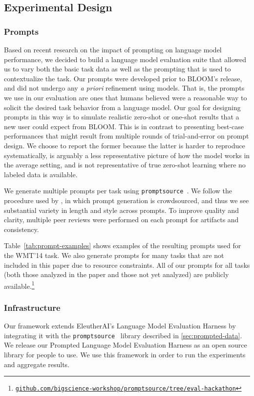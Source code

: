 \subsection{Experimental Design}
\label{sec:eval:design}

\subsubsection{Prompts} Based on recent research on the impact of prompting on language model performance, we decided to build a language model evaluation suite that allowed us to vary both the basic task data as well as the prompting that is used to contextualize the task. Our prompts were developed prior to BLOOM's release, and did not undergo any \textit{a priori} refinement using models. That is, the prompts we use in our evaluation are ones that humans believed were a reasonable way to solicit the desired task behavior from a language model. Our goal for designing prompts in this way is to simulate realistic zero-shot or one-shot results that a new user could expect from BLOOM. This is in contrast to presenting best-case performances that might result from multiple rounds of trial-and-error on prompt design. We choose to report the former because the latter is harder to reproduce systematically, is arguably a less representative picture of how the model works in the average setting, and is not representative of true zero-shot learning where no labeled data is available. 

We generate multiple prompts per task using \texttt{promptsource}~\citep{bach2022promptsource}. We follow the procedure used by \citet{sanh2022multitask}, in which prompt generation is crowdsourced, and thus we see substantial variety in length and style across prompts. To improve quality and clarity, multiple peer reviews were performed on each prompt for artifacts and consistency.

Table~\ref{tab:prompt-examples} shows examples of the resulting prompts used for the WMT'14 task. We also generate prompts for many tasks that are not included in this paper due to resource constraints. All of our prompts for all tasks (both those analyzed in the paper and those not yet analyzed) are publicly available.\footnote{\href{https://github.com/bigscience-workshop/promptsource/tree/eval-hackathon}{\texttt{github.com/bigscience-workshop/promptsource/tree/eval-hackathon}}}

\subsubsection{Infrastructure} 
Our framework extends EleutherAI's Language Model Evaluation Harness \citep{eval-harness} by integrating it with the \texttt{promptsource}~\citep{bach2022promptsource} library described in \ref{sec:prompted-data}. We release our Prompted Language Model Evaluation Harness as an open source library for people to use. We use this framework in order to run the experiments and aggregate results.

